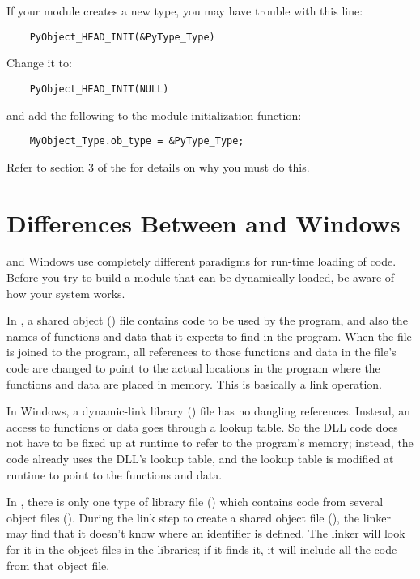 If your module creates a new type, you may have trouble with this line:

\begin{verbatim}
    PyObject_HEAD_INIT(&PyType_Type)
\end{verbatim}

Change it to:

\begin{verbatim}
    PyObject_HEAD_INIT(NULL)
\end{verbatim}

and add the following to the module initialization function:

\begin{verbatim}
    MyObject_Type.ob_type = &PyType_Type;
\end{verbatim}

Refer to section 3 of the
 for details
on why you must do this.


\section{Differences Between \UNIX{} and Windows
     \label{dynamic-linking}}


\UNIX{} and Windows use completely different paradigms for run-time
loading of code.  Before you try to build a module that can be
dynamically loaded, be aware of how your system works.

In \UNIX, a shared object () file contains code to be used by the
program, and also the names of functions and data that it expects to
find in the program.  When the file is joined to the program, all
references to those functions and data in the file's code are changed
to point to the actual locations in the program where the functions
and data are placed in memory.  This is basically a link operation.

In Windows, a dynamic-link library () file has no dangling
references.  Instead, an access to functions or data goes through a
lookup table.  So the DLL code does not have to be fixed up at runtime
to refer to the program's memory; instead, the code already uses the
DLL's lookup table, and the lookup table is modified at runtime to
point to the functions and data.

In \UNIX, there is only one type of library file () which
contains code from several object files ().  During the link
step to create a shared object file (), the linker may find
that it doesn't know where an identifier is defined.  The linker will
look for it in the object files in the libraries; if it finds it, it
will include all the code from that object file.


